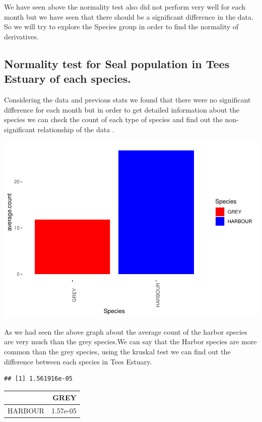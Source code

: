 \documentclass[
]{article}
\begin{document}
We have seen above the normality test also did not perform very well for
each month but we have seen that there should be a significant
difference in the data. So we will try to explore the Species group in
order to find the normality of derivatives.

\hypertarget{normality-test-for-seal-population-in-tees-estuary-of-each-species.}{%
\subsection{Normality test for Seal population in Tees Estuary of each
species.}\label{normality-test-for-seal-population-in-tees-estuary-of-each-species.}}

Considering the data and previous stats we found that there were no
significant difference for each month but in order to get detailed
information about the species we can check the count of each type of
species and find out the non-significant relationship of the data .

\includegraphics{Statistical-analysis-in-RStudio_files/figure-latex/unnamed-chunk-19-1.pdf}

As we had seen the above graph about the average count of the harbor
species are very much than the grey species.We can say that the Harbor
species are more common than the grey species, using the kruskal test we
can find out the difference between each species in Tees Estuary.

\begin{verbatim}
## [1] 1.561916e-05
\end{verbatim}

\begin{longtable}[]{@{}lr@{}}
\toprule
& GREY\tabularnewline
\midrule
\endhead
HARBOUR & 1.57e-05\tabularnewline
\bottomrule
\end{longtable}
\end{document}
